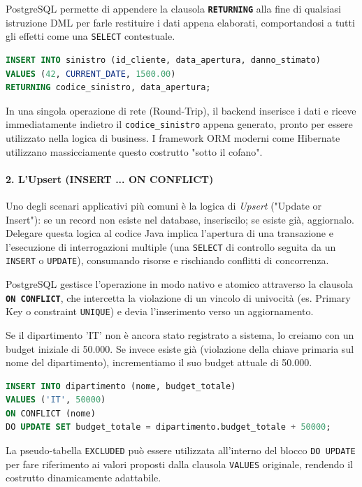 PostgreSQL permette di appendere la clausola \textbf{\texttt{RETURNING}} alla fine di qualsiasi istruzione DML per farle restituire i dati appena elaborati, comportandosi a tutti gli effetti come una \texttt{SELECT} contestuale.

\begin{example}
\begin{lstlisting}[language=SQL, basicstyle=\ttfamily\small, keywordstyle=\color{blue}\bfseries]
INSERT INTO sinistro (id_cliente, data_apertura, danno_stimato)
VALUES (42, CURRENT_DATE, 1500.00)
RETURNING codice_sinistro, data_apertura;
\end{lstlisting}
In una singola operazione di rete (Round-Trip), il backend inserisce i dati e riceve immediatamente indietro il \texttt{codice\_sinistro} appena generato, pronto per essere utilizzato nella logica di business. I framework ORM moderni come Hibernate utilizzano massicciamente questo costrutto "sotto il cofano".
\end{example}

\paragraph{2. L'Upsert (INSERT ... ON CONFLICT)}
Uno degli scenari applicativi più comuni è la logica di \textit{Upsert} ("Update or Insert"): se un record non esiste nel database, inseriscilo; se esiste già, aggiornalo.
Delegare questa logica al codice Java implica l'apertura di una transazione e l'esecuzione di interrogazioni multiple (una \texttt{SELECT} di controllo seguita da un \texttt{INSERT} o \texttt{UPDATE}), consumando risorse e rischiando conflitti di concorrenza.

PostgreSQL gestisce l'operazione in modo nativo e atomico attraverso la clausola \textbf{\texttt{ON CONFLICT}}, che intercetta la violazione di un vincolo di univocità (es. Primary Key o constraint \texttt{UNIQUE}) e devia l'inserimento verso un aggiornamento.

\begin{example}
Se il dipartimento 'IT' non è ancora stato registrato a sistema, lo creiamo con un budget iniziale di 50.000. Se invece esiste già (violazione della chiave primaria sul nome del dipartimento), incrementiamo il suo budget attuale di 50.000.

\begin{lstlisting}[language=SQL, basicstyle=\ttfamily\small, keywordstyle=\color{blue}\bfseries]
INSERT INTO dipartimento (nome, budget_totale)
VALUES ('IT', 50000)
ON CONFLICT (nome) 
DO UPDATE SET budget_totale = dipartimento.budget_totale + 50000;
\end{lstlisting}
La pseudo-tabella \texttt{EXCLUDED} può essere utilizzata all'interno del blocco \texttt{DO UPDATE} per fare riferimento ai valori proposti dalla clausola \texttt{VALUES} originale, rendendo il costrutto dinamicamente adattabile.
\end{example}

